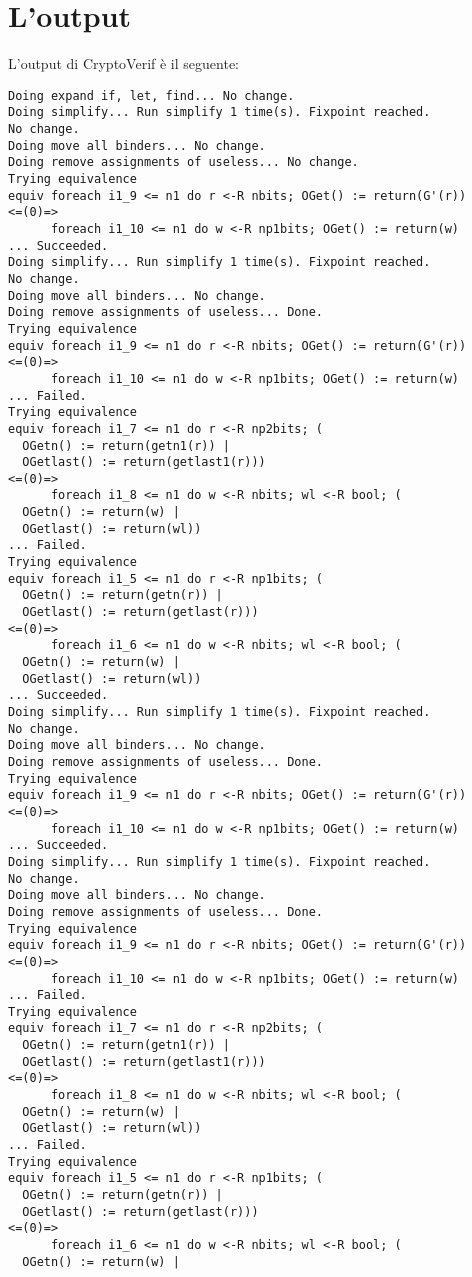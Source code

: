 \documentclass[a4paper,openright,twoside,12pt]{report}
\begin{document}
\section{L'output}
L'output di CryptoVerif \`e il seguente:
\begin{verbatim}
Doing expand if, let, find... No change.
Doing simplify... Run simplify 1 time(s). Fixpoint reached.
No change.
Doing move all binders... No change.
Doing remove assignments of useless... No change.
Trying equivalence
equiv foreach i1_9 <= n1 do r <-R nbits; OGet() := return(G'(r))
<=(0)=>
      foreach i1_10 <= n1 do w <-R np1bits; OGet() := return(w)
... Succeeded.
Doing simplify... Run simplify 1 time(s). Fixpoint reached.
No change.
Doing move all binders... No change.
Doing remove assignments of useless... Done.
Trying equivalence
equiv foreach i1_9 <= n1 do r <-R nbits; OGet() := return(G'(r))
<=(0)=>
      foreach i1_10 <= n1 do w <-R np1bits; OGet() := return(w)
... Failed.
Trying equivalence
equiv foreach i1_7 <= n1 do r <-R np2bits; (
  OGetn() := return(getn1(r)) |
  OGetlast() := return(getlast1(r)))
<=(0)=>
      foreach i1_8 <= n1 do w <-R nbits; wl <-R bool; (
  OGetn() := return(w) |
  OGetlast() := return(wl))
... Failed.
Trying equivalence
equiv foreach i1_5 <= n1 do r <-R np1bits; (
  OGetn() := return(getn(r)) |
  OGetlast() := return(getlast(r)))
<=(0)=>
      foreach i1_6 <= n1 do w <-R nbits; wl <-R bool; (
  OGetn() := return(w) |
  OGetlast() := return(wl))
... Succeeded.
Doing simplify... Run simplify 1 time(s). Fixpoint reached.
No change.
Doing move all binders... No change.
Doing remove assignments of useless... Done.
Trying equivalence
equiv foreach i1_9 <= n1 do r <-R nbits; OGet() := return(G'(r))
<=(0)=>
      foreach i1_10 <= n1 do w <-R np1bits; OGet() := return(w)
... Succeeded.
Doing simplify... Run simplify 1 time(s). Fixpoint reached.
No change.
Doing move all binders... No change.
Doing remove assignments of useless... Done.
Trying equivalence
equiv foreach i1_9 <= n1 do r <-R nbits; OGet() := return(G'(r))
<=(0)=>
      foreach i1_10 <= n1 do w <-R np1bits; OGet() := return(w)
... Failed.
Trying equivalence
equiv foreach i1_7 <= n1 do r <-R np2bits; (
  OGetn() := return(getn1(r)) |
  OGetlast() := return(getlast1(r)))
<=(0)=>
      foreach i1_8 <= n1 do w <-R nbits; wl <-R bool; (
  OGetn() := return(w) |
  OGetlast() := return(wl))
... Failed.
Trying equivalence
equiv foreach i1_5 <= n1 do r <-R np1bits; (
  OGetn() := return(getn(r)) |
  OGetlast() := return(getlast(r)))
<=(0)=>
      foreach i1_6 <= n1 do w <-R nbits; wl <-R bool; (
  OGetn() := return(w) |

\end{verbatim}
\end{document}
